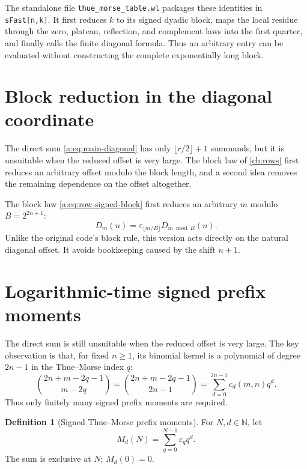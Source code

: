 \documentclass[11pt,a4paper,oneside,openany]{book}
\numberwithin{equation}{chapter}
\theoremstyle{definition}
\newtheorem{definition}[theorem]{Definition}
\theoremstyle{remark}
\newcommand{\N}{\mathbb N}
\newcommand{\eps}{\varepsilon}
\newcommand{\Diag}{D}
\begin{document}
The standalone file \texttt{thue\_morse\_table.wl} packages these identities in
\texttt{sFast[n,k]}.  It first reduces \(k\) to its signed dyadic block, maps the
local residue through the zero, plateau, reflection, and complement laws into the
first quarter, and finally calls the finite diagonal formula.  Thus an arbitrary
entry can be evaluated without constructing the complete exponentially long block.

\section{Block reduction in the diagonal coordinate}
The direct sum \eqref{a:eq:main-diagonal} has only $\lfloor r/2\rfloor+1$
summands, but it is unsuitable when the reduced offset is very large. The
block law of \cref{ch:rows} first reduces an arbitrary offset modulo the
block length, and a second idea removes the remaining dependence on the
offset altogether.

The block law \eqref{a:eq:row-signed-block} first reduces an arbitrary $m$ modulo
$B=2^{2n+1}$:
\begin{equation}
 \Diag_m(n)=\eps_{\lfloor m/B\rfloor}\Diag_{m\bmod B}(n).
 \label{b:eq:diagonal-block-reduction}
\end{equation}
Unlike the original code's block rule, this version acts directly on the
natural diagonal offset.  It avoids bookkeeping caused by the shift $n+1$.
\section{Logarithmic-time signed prefix moments}

The direct sum is still unsuitable when the reduced offset is very large.
The key observation is that, for fixed $n\ge1$, its binomial kernel is a
polynomial of degree $2n-1$ in the Thue--Morse index $q$:
\begin{equation}
 \binom{2n+m-2q-1}{m-2q}
 =\binom{2n+m-2q-1}{2n-1}
 =\sum_{d=0}^{2n-1}c_d(m,n)q^d.
 \label{b:eq:kernel-polynomial}
\end{equation}
Thus only finitely many signed prefix moments are required.

\begin{definition}[Signed Thue--Morse prefix moments]
For $N,d\in\N$, let
\begin{equation}
 M_d(N)=\sum_{q=0}^{N-1}\eps_qq^d.
 \label{b:eq:prefix-moment}
\end{equation}
The sum is exclusive at $N$; $M_d(0)=0$.
\end{definition}
\end{document}
